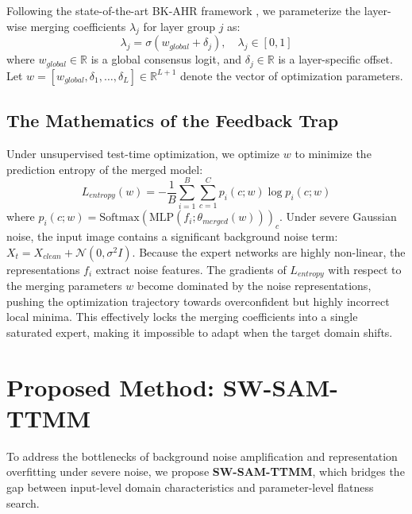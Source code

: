 \documentclass{article}
\theoremstyle{plain}
\theoremstyle{definition}
\theoremstyle{remark}
\begin{document}
Following the state-of-the-art BK-AHR framework \cite{anonymous2026a}, we parameterize the layer-wise merging coefficients $\lambda_j$ for layer group $j$ as:
\begin{equation}
  \lambda_j = \sigma(w_{global} + \delta_j), \quad \lambda_j \in [0, 1]
\end{equation}
where $w_{global} \in \mathbb{R}$ is a global consensus logit, and $\delta_j \in \mathbb{R}$ is a layer-specific offset. Let $w = [w_{global}, \delta_1, \ldots, \delta_L] \in \mathbb{R}^{L+1}$ denote the vector of optimization parameters.

\subsection{The Mathematics of the Feedback Trap}
Under unsupervised test-time optimization, we optimize $w$ to minimize the prediction entropy of the merged model:
\begin{equation}
  L_{entropy}(w) = -\frac{1}{B} \sum_{i=1}^B \sum_{c=1}^C p_i(c; w) \log p_i(c; w)
\end{equation}
where $p_i(c; w) = \text{Softmax}(\text{MLP}(f_i; \theta_{merged}(w)))_c$.
Under severe Gaussian noise, the input image contains a significant background noise term: $X_t = X_{clean} + \mathcal{N}(0, \sigma^2 I)$. 
Because the expert networks are highly non-linear, the representations $f_i$ extract noise features. The gradients of $L_{entropy}$ with respect to the merging parameters $w$ become dominated by the noise representations, pushing the optimization trajectory towards overconfident but highly incorrect local minima. This effectively locks the merging coefficients into a single saturated expert, making it impossible to adapt when the target domain shifts.

\section{Proposed Method: SW-SAM-TTMM}
\label{submission-method}

To address the bottlenecks of background noise amplification and representation overfitting under severe noise, we propose \textbf{SW-SAM-TTMM}, which bridges the gap between input-level domain characteristics and parameter-level flatness search.
\end{document}
